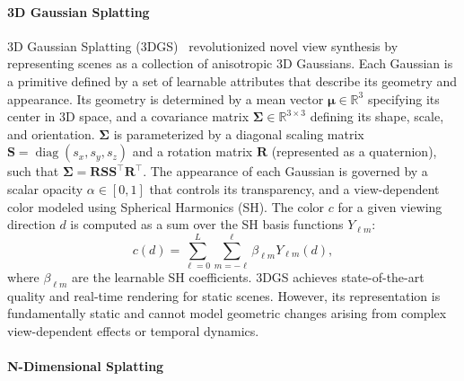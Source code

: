 \documentclass{article}
\theoremstyle{plain}
\theoremstyle{definition}
\theoremstyle{remark}
\begin{document}
\paragraph{3D Gaussian Splatting}
3D Gaussian Splatting (3DGS)~\cite{3dgs} revolutionized novel view synthesis by representing scenes as a collection of anisotropic 3D Gaussians. Each Gaussian is a primitive defined by a set of learnable attributes that describe its geometry and appearance. Its geometry is determined by a mean vector \(\boldsymbol{\mu} \in \mathbb{R}^3\) specifying its center in 3D space, and a covariance matrix \(\boldsymbol{\Sigma} \in \mathbb{R}^{3 \times 3}\) defining its shape, scale, and orientation. \(\boldsymbol{\Sigma}\) is parameterized by a diagonal scaling matrix \(\mathbf{S} = \operatorname{diag}(s_x, s_y, s_z)\) and a rotation matrix \(\mathbf{R}\) (represented as a quaternion), such that \(\boldsymbol{\Sigma} = \mathbf{R} \mathbf{S} \mathbf{S}^\top \mathbf{R}^\top\). The appearance of each Gaussian is governed by a scalar opacity \(\alpha \in [0, 1]\) that controls its transparency, and a view-dependent color modeled using Spherical Harmonics (SH). The color \(c\) for a given viewing direction \(d\) is computed as a sum over the SH basis functions \(Y_{\ell m}\):
\begin{equation}
c(d) = \sum_{\ell=0}^{L} \sum_{m=-\ell}^{\ell} \beta_{\ell m} Y_{\ell m}(d),
\end{equation}
where \(\beta_{\ell m}\) are the learnable SH coefficients. 3DGS achieves state-of-the-art quality and real-time rendering for static scenes. However, its representation is fundamentally static and cannot model geometric changes arising from complex view-dependent effects or temporal dynamics.

\paragraph{N-Dimensional Splatting}
\end{document}
